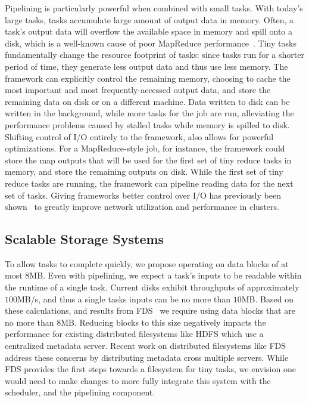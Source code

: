 Pipelining is particularly powerful when combined with small tasks. With
today's large tasks, tasks accumulate large amount of output data in memory.
Often, a task's output data will overflow the available space in memory
and spill onto a disk, which is a well-known cause of poor MapReduce
performance~\cite{toddlipconthing}. Tiny tasks fundamentally change the
resource footprint of tasks: since tasks run for a shorter period of time,
they generate less output data and thus use less memory. The framework can
explicitly control the remaining memory, choosing to cache the most important
and most frequently-accessed output data, and store the remaining data on disk
or on a different machine. Data written to disk can be written in the
background, while more tasks for the job are run, alleviating the performance
problems caused by stalled tasks  while memory is spilled to disk.
Shifting control of I/O entirely to the framework, also allows for
powerful optimizations.  For a MapReduce-style job, for instance, the
framework could store the map outputs that will be used for the first set of
tiny reduce tasks in memory, and store the remaining outputs on disk. While
the first set of tiny reduce tasks are running, the framework can pipeline
reading data for the next set of tasks.  Giving frameworks better control over
I/O has previously been shown~\cite{chowdhury2011managing, cohwdhury2012coflow}
to greatly improve network utilization and performance in clusters.

\subsection{Scalable Storage Systems}
To allow tasks to complete quickly, we propose operating on data blocks of
at most $8$MB. Even with pipelining, we
expect a task's inputs to be readable within the runtime of a single task. Current disks exhibit
throughputs of approximately $100$MB/s, and thus a single tasks inputs can be no more than $10$MB.
Based
on these calculations, and results from FDS~\cite{nightingale2012flat} we require using data blocks
that are no more than $8$MB. Reducing blocks to this size negatively impacts the performance for
existing distributed filesystems like HDFS which use a centralized metadata server. Recent work on
distributed filesystems like FDS address these concerns by distributing metadata cross multiple
servers. While FDS provides the first steps towards a filesystem for tiny tasks, we envision
one would need to make changes to more fully integrate this system with the scheduler, and
the pipelining component.

